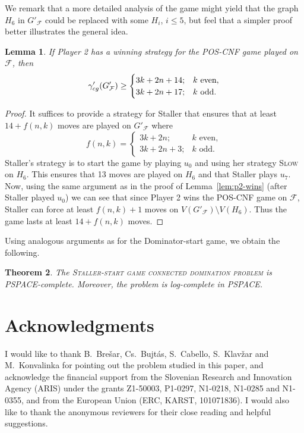 \documentclass[12pt]{article}
\newtheorem{theorem}{Theorem}[section]
\newtheorem{lemma}[theorem]{Lemma}
\newcommand{\gcg}{\gamma_{\rm cg}}
\newcommand{\F}{\mathcal{F}}
\begin{document}
We remark that a more detailed analysis of the game might yield that the graph $H_6$ in $G'_\F$ could be replaced with some $H_i$, $i \leq 5$, but feel that a simpler proof better illustrates the general idea.

\begin{lemma}
	\label{lem:p2-wins'}
	If Player 2 has a winning strategy for the POS-CNF game played on $\F$, then $$\gcg'(G'_\F) \geq \begin{cases}
		3k + 2n + 14; & k \text{ even},\\
		3k + 2n + 17; & k \text{ odd}.
	\end{cases}$$
\end{lemma}

\begin{proof}
	It suffices to provide a strategy for Staller that ensures that at least $14 + f(n,k)$ moves are played on $G'_\F$ where $$f(n,k) = \begin{cases}
		3k + 2n; & k \text{ even},\\
		3k + 2n + 3; & k \text{ odd}.
	\end{cases}$$ Staller's strategy is to start the game by playing $u_0$ and using her strategy \textsc{Slow} on $H_6$. This ensures that 13 moves are played on $H_6$ and that Staller plays $u_7$. Now, using the same argument as in the proof of Lemma~\ref{lem:p2-wins} (after Staller played $u_0$) we can see that since Player 2 wins the POS-CNF game on $\F$, Staller can force at least $f(n,k)+1$ moves on $V(G'_\F) \setminus V(H_6)$. Thus the game lasts at least $14 + f(n,k)$ moves.
\end{proof}

Using analogous arguments as for the Dominator-start game, we obtain the following.

\begin{theorem}
	\label{thm:main'}
	The \textsc{Staller-start game connected domination problem} is PSPACE-complete. Moreover, the problem is log-complete in PSPACE.
\end{theorem}


\section*{Acknowledgments}
I would like to thank B.~Brešar, Cs.~Bujtás, S.~Cabello, S.~Klavžar and M.~Konvalinka for pointing out the problem studied in this paper, and acknowledge the financial support from the Slovenian Research and Innovation Agency (ARIS) under the grants Z1-50003, P1-0297, N1-0218, N1-0285 and N1-0355, and from the European Union (ERC, KARST, 101071836). I would also like to thank the anonymous reviewers for their close reading and helpful suggestions. 


\printbibliography
\end{document}
